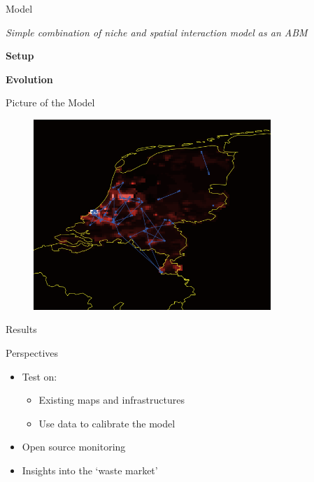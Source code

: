 \documentclass{beamer}
\begin{document}
\begin{frame}{Model}

\textit{Simple combination of niche and spatial interaction model as an ABM}


\medskip

\textbf{Setup}

\textbf{Evolution}




\end{frame}

\begin{frame}{Picture of the Model}

\begin{figure}
\includegraphics[width=0.8\textwidth]{CENL.png}
\end{figure}

\end{frame}

\begin{frame}{Results}

\end{frame}

\begin{frame}{Perspectives}

\begin{itemize}
\item Test on:
\begin{itemize}
\item Existing maps and infrastructures
\item Use data to calibrate the model
\end{itemize}

\item Open source monitoring
\item Insights into the `waste market'

\end{itemize}
\end{frame}
\end{document}
